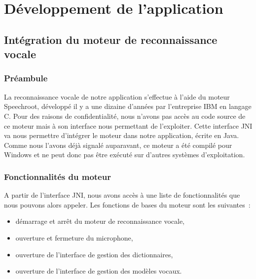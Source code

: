 \chapter{Développement de l'application}
\minitoc

\section{Intégration du moteur de reconnaissance vocale}

\subsection{Préambule}
La reconnaissance vocale de notre application s'effectue à l'aide du moteur Speechroot, développé il y a une dizaine d'années par l'entreprise IBM en langage C.
Pour des raisons de confidentialité, nous n'avons pas accès au code source de ce moteur mais à son interface nous permettant de l'exploiter.
Cette interface JNI va nous permettre d'intégrer le moteur dans notre application, écrite en Java.
Comme nous l'avons déjà signalé auparavant, ce moteur a été compilé pour Windows et ne peut donc pas être exécuté sur d'autres systèmes d'exploitation.

\subsection{Fonctionnalités du moteur}
A partir de l'interface JNI, nous avons accès à une liste de fonctionnalités que nous pouvons alors appeler.
Les fonctions de bases du moteur sont les suivantes~:
\begin{itemize}
\item démarrage et arrêt du moteur de reconnaissance vocale,
\item ouverture et fermeture du microphone,
\item ouverture de l'interface de gestion des dictionnaires,
\item ouverture de l'interface de gestion des modèles vocaux.
\end{itemize}	

